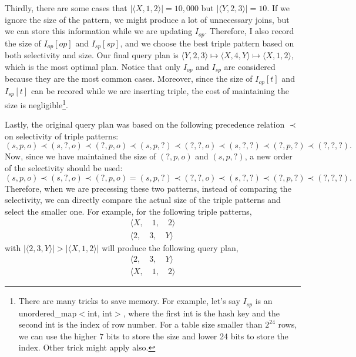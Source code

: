 \documentclass{article}
\begin{document}
\begin{enumerate}
\begin{enumerate}
Thirdly, there are some cases that $|\langle X, 1, 2\rangle| = 10,000$ but $|\langle Y, 2, 3\rangle| = 10$. If we ignore the size of the pattern, we might produce a lot of unnecessary joins, but we can store this information while we are updating $I_{op}$. Therefore, I also record the size of $I_{op}[op]$ and $I_{sp}[sp]$, and we choose the best triple pattern based on both selectivity and size. Our final query plan is $\langle Y, 2, 3\rangle \mapsto \langle X, 4, Y\rangle \mapsto \langle X, 1, 2\rangle$, which is the most optimal plan. Notice that only $I_{op}$ and $I_{sp}$ are considered because they are the most common cases. Moreover, since the size of $I_{op}[t]$ and $I_{sp}[t]$ can be recored while we are inserting triple, the cost of maintaining the size is negligible\footnote{There are many tricks to save memory. For example, let's say $I_{sp}$ is an unordered\_map$<$int, int$>$, where the first int is the hash key and the second int is the index of row number. For a table size smaller than $2^{24}$ rows, we can use the higher $7$ bits to store the size and lower 24 bits to store the index. Other trick might apply also.}. 

Lastly, the original query plan was based on the following precedence relation $\prec$ on selectivity of triple patterns: 
\begin{equation*}
	(s, p, o) \prec (s, ?, o) \prec (?, p, o) \prec (s, p, ?) \prec (?, ?, o) \prec (s, ?, ?) \prec (?, p, ?) \prec (?, ?, ?).
\end{equation*}
Now, since we have maintained the size of $(?, p, o)$ and $(s, p, ?)$, a new order of the selectivity should be used:
\begin{equation*}
	(s, p, o) \prec (s, ?, o) \prec (?, p, o) = (s, p, ?) \prec (?, ?, o) \prec (s, ?, ?) \prec (?, p, ?) \prec (?, ?, ?).
\end{equation*}
Therefore, when we are precessing these two patterns, instead of comparing the selectivity, we can directly compare the actual size of the triple patterns and select the smaller one. For example, for the following triple patterns,
\begin{align*}
	\langle X,\quad 1,\quad 2\rangle \\
	\langle 2,\quad 3,\quad Y\rangle
\end{align*}
with $|\langle 2, 3, Y\rangle| > |\langle X, 1, 2\rangle|$ will produce the following query plan,
\begin{align*}
	\langle 2,\quad 3,\quad Y\rangle\\
	\langle X,\quad 1,\quad 2\rangle
\end{align*}


\end{enumerate}
\end{enumerate}
\end{document}

